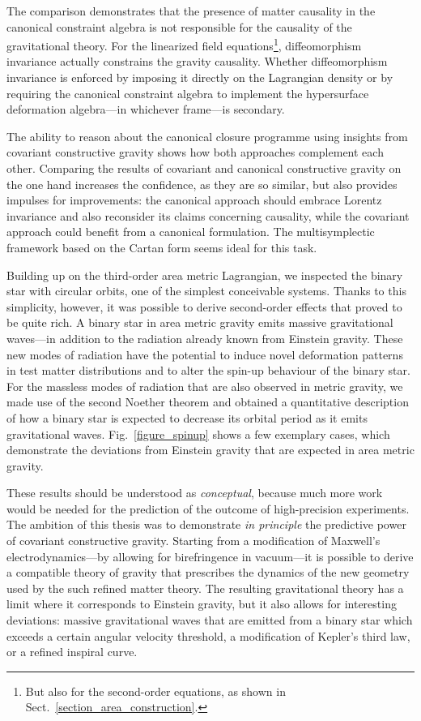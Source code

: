 The comparison demonstrates that the presence of matter causality in the canonical constraint algebra is not responsible for the causality of the gravitational theory. For the linearized field equations\footnote{But also for the second-order equations, as shown in Sect.~\ref{section_area_construction}.}, diffeomorphism invariance actually constrains the gravity causality. Whether diffeomorphism invariance is enforced by imposing it directly on the Lagrangian density or by requiring the canonical constraint algebra to implement the hypersurface deformation algebra---in whichever frame---is secondary.

The ability to reason about the canonical closure programme using insights from covariant constructive gravity shows how both approaches complement each other. Comparing the results of covariant and canonical constructive gravity on the one hand increases the confidence, as they are so similar, but also provides impulses for improvements: the canonical approach should embrace Lorentz invariance and also reconsider its claims concerning causality, while the covariant approach could benefit from a canonical formulation. The multisymplectic framework based on the Cartan form \cite{Gotay_1991} seems ideal for this task.

Building up on the third-order area metric Lagrangian, we inspected the binary star with circular orbits, one of the simplest conceivable systems. Thanks to this simplicity, however, it was possible to derive second-order effects that proved to be quite rich. A binary star in area metric gravity emits massive gravitational waves---in addition to the radiation already known from Einstein gravity. These new modes of radiation have the potential to induce novel deformation patterns in test matter distributions and to alter the spin-up behaviour of the binary star. For the massless modes of radiation that are also observed in metric gravity, we made use of the second Noether theorem and obtained a quantitative description of how a binary star is expected to decrease its orbital period as it emits gravitational waves. Fig.~\ref{figure_spinup} shows a few exemplary cases, which demonstrate the deviations from Einstein gravity that are expected in area metric gravity.

These results should be understood as \emph{conceptual}, because much more work would be needed for the prediction of the outcome of high-precision experiments. The ambition of this thesis was to demonstrate \emph{in principle} the predictive power of covariant constructive gravity. Starting from a modification of Maxwell's electrodynamics---by allowing for birefringence in vacuum---it is possible to derive a compatible theory of gravity that prescribes the dynamics of the new geometry used by the such refined matter theory. The resulting gravitational theory has a limit where it corresponds to Einstein gravity, but it also allows for interesting deviations: massive gravitational waves that are emitted from a binary star which exceeds a certain angular velocity threshold, a modification of Kepler's third law, or a refined inspiral curve.

